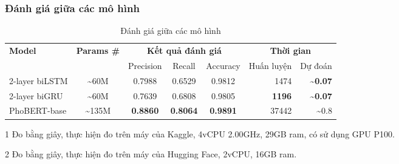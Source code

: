 \subsubsection{Đánh giá giữa các mô hình}
\begin{table}[htb]
    \centering
    \caption{Đánh giá giữa các mô hình}
    \begin{threeparttable}
        \begin{tabular}{l c c c c r r}
            \toprule
            \multirow{2}{*}{\textbf{Model}} & \multirow{2}{*}{\textbf{Params \#}} & \multicolumn{3}{c}{\textbf{Kết quả đánh giá}} & \multicolumn{2}{c}{\textbf{Thời gian}}                                                                         \\\cmidrule(lr){3-5}\cmidrule{6-7}
                                            &                                     & Precision                                     & Recall                                 & Accuracy        & Huấn luyện\tnote{1} & Dự đoán\tnote{2}              \\\midrule
            2-layer biLSTM                  & \textasciitilde 60M                 & 0.7988                                        & 0.6529                                 & 0.9812          & 1474                & \textbf{\textasciitilde 0.07} \\
            2-layer biGRU                   & \textasciitilde 60M                 & 0.7639                                        & 0.6808                                 & 0.9805          & \textbf{1196}       & \textbf{\textasciitilde 0.07} \\
            PhoBERT-base                    & \textasciitilde 135M                & \textbf{0.8860}                               & \textbf{0.8064}                        & \textbf{0.9891} & 37442               & \textasciitilde 0.8           \\
            \bottomrule
        \end{tabular}
        \begin{tablenotes}
            \item[1] Đo bằng giây, thực hiện đo trên máy của Kaggle, 4vCPU 2.00GHz, 29GB ram, có sử dụng GPU P100.
            \item[2] Đo bằng giây, thực hiện đo trên máy của Hugging Face, 2vCPU, 16GB ram.
        \end{tablenotes}
    \end{threeparttable}
\end{table}

